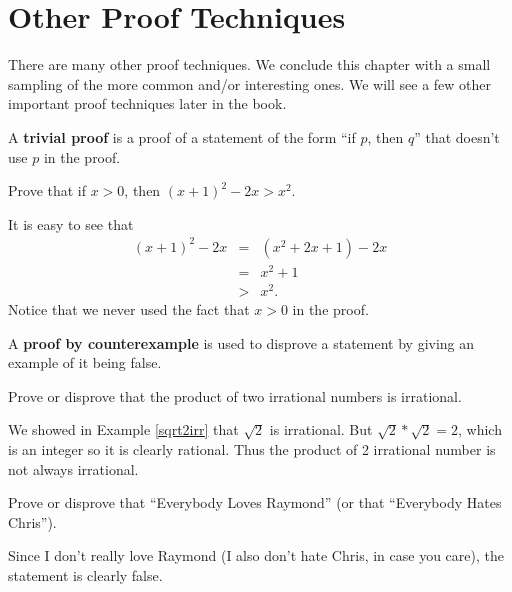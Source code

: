 \newpage
\section{Other Proof Techniques}\label{section:other}
There are many other proof techniques.  
We conclude this chapter with a small sampling of the more common and/or interesting ones.  
We will see a few other important proof techniques later in the book.

\begin{df}
A {\bf trivial proof} is a proof of a statement of the form ``if $p$, then $q$''  that doesn't use $p$ in the proof.
\end{df}

\begin{exa}
Prove that if $x>0$, then $(x+1)^2 - 2x > x^2$.
\begin{pf}
It is easy to see that 
\begin{eqnarray*}
(x+1)^2 - 2x&=&(x^2+2x+1) - 2x\\
&=&x^2+1\\
&>&x^2.
\end{eqnarray*}
Notice that we never used the fact that $x>0$ in the proof.
\end{pf}
\end{exa}

\begin{df}
A {\bf proof by counterexample} is used to disprove a statement by giving an example of it being false.
\end{df}

\begin{exa}
Prove or disprove that the product of two irrational numbers is irrational.
\begin{pf}
We showed in Example \ref{sqrt2irr} that $\sqrt{2}$ is irrational.  But $\sqrt{2}*\sqrt{2}=2$, which
is an integer so it is clearly rational.  Thus the product of 2 irrational number is not always irrational.
\end{pf}
\end{exa}

\begin{exa}
Prove or disprove that ``Everybody Loves Raymond'' (or that ``Everybody Hates Chris'').
\begin{pf}
Since I don't really love Raymond (I also don't hate Chris, in case you care), the statement is clearly false.
\end{pf}
\end{exa}


